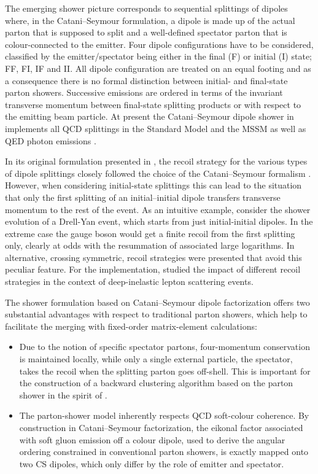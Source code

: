 The emerging shower picture corresponds to sequential splittings of dipoles 
where, in the Catani--Seymour formulation, a dipole is made up of the actual 
parton that is supposed to split and a well-defined spectator parton that 
is colour-connected to the emitter. Four dipole configurations have to be 
considered, classified by the emitter/spectator being either in the final 
(F) or initial (I) state; FF, FI, IF and II. All dipole configuration are 
treated on an equal footing and as a consequence there is no formal distinction 
between initial- and final-state parton showers. Successive emissions are 
ordered in terms of the invariant transverse momentum between final-state 
splitting products or with respect to the emitting beam particle. At present 
the Catani--Seymour dipole shower in \Sherpa implements all QCD splittings 
in the Standard Model and the MSSM as well as QED photon emissions 
\cite{Hoeche:2009xc}.

In its original formulation presented in \cite{Schumann:2007mg}, the recoil 
strategy for the various types of dipole splittings closely followed the 
choice of the Catani--Seymour formalism \cite{Catani:1996vz,Catani:2002hc}.
However, when considering initial-state splittings this can lead to the
situation that only the first splitting of an initial--initial dipole 
transfers transverse momentum to the rest of the event. As an intuitive 
example, consider the shower evolution of a Drell-Yan event, which starts from just initial-initial dipoles. In the extreme case the gauge boson 
would get a finite recoil from the first splitting only, clearly at odds 
with the resummation of associated large logarithms. In 
\cite{Platzer:2009jq,Hoeche:2009xc} alternative, crossing symmetric, 
recoil strategies were presented that avoid this peculiar feature. 
For the \Sherpa implementation, \cite{Carli:2010cg} studied the impact 
of different recoil strategies in the context of deep-inelastic lepton 
scattering events.

The shower formulation based on Catani--Seymour dipole factorization 
offers two substantial advantages with respect to traditional parton showers,
which help to facilitate the merging with fixed-order matrix-element 
calculations:
\begin{itemize}
\item Due to the notion of specific spectator partons, four-momentum 
conservation is maintained locally, while only a single external
particle, the spectator, takes the recoil when the splitting parton
goes off-shell. This is important for the construction of a backward 
clustering algorithm based on the parton shower in the spirit of 
\cite{Hoeche:2009rj}.
\item The parton-shower model inherently respects QCD soft-colour coherence. 
By construction in Catani--Seymour factorization, the eikonal factor associated 
with soft gluon emission off a colour dipole, used to derive the angular ordering 
constrained in conventional parton showers, is exactly mapped onto two CS dipoles,
which only differ by the role of emitter and spectator.
\end{itemize}   
 

